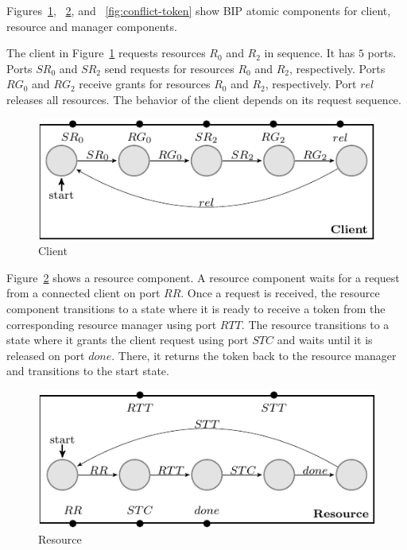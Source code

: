 Figures~\ref{fig:client},
~\ref{fig:resource}, and
~\ref{fig:conflict-token}
show BIP atomic components for client, resource and manager components. 

The client in Figure~\ref{fig:client} requests resources $R_0$ and $R_2$ in sequence. It has $5$ ports. 
Ports $SR_0$ and $SR_2$ send requests for 
resources $R_0$ and $R_2$, respectively.
Ports $RG_0$ and $RG_2$ receive grants for 
resources $R_0$ and $R_2$, respectively.
Port $rel$ releases all resources. 
The behavior of the client depends on its request sequence. 

\begin{figure}[H]
\begin{center}
\includegraphics[scale=1.2]{compiledfigures/client-crop.pdf}
\caption{Client}
\label{fig:client}
\end{center}
\end{figure}

Figure~\ref{fig:resource} shows a resource component. 
A resource component waits for a request from a connected client on port $RR$. 
Once a request is received, the resource component transitions to a state where it is ready to 
receive a token from the corresponding resource manager using port $RTT$.
The resource transitions to a state where it grants the client request using port $STC$ and waits until it is released on port $done$. 
There, it returns the token back to the resource manager and transitions to the start state. 

\begin{figure}[H]
\begin{center}
\includegraphics[scale=1.2]{compiledfigures/resource-crop.pdf}
\caption{Resource}
\label{fig:resource}
\end{center}
\end{figure}

